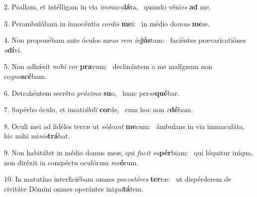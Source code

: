 2. Psallam, et intélligam in via \textit{im}\textit{ma}\textit{cu}\textbf{lá}ta, \ast\  quando véni\textit{es} \textbf{ad} me.\

3. Perambulábam in innocénti\textit{a} \textit{cor}\textit{dis} \textbf{me}i: \ast\  in médio do\textit{mus} \textbf{me}æ.\

4. Non proponébam ante óculos me\textit{os} \textit{rem} \textit{in}\textbf{jús}tam: \ast\  faciéntes prævaricatiónes \textit{o}\textbf{dí}vi.\

5. Non adhǽsit \textit{mi}\textit{hi} \textit{cor} \textbf{pra}vum: \ast\  declinántem a me malígnum non co\textit{gno}\textbf{scé}bam.\

6. Detrahéntem secréto \textit{pró}\textit{xi}\textit{mo} \textbf{su}o, \ast\  hunc per\textit{se}\textbf{qué}bar.\

7. Supérbo óculo, et insati\textit{á}\textit{bi}\textit{li} \textbf{cor}de, \ast\  cum hoc non \textit{e}\textbf{dé}bam.\

8. Oculi mei ad fidéles terræ ut \textit{sé}\textit{de}\textit{ant} \textbf{me}cum: \ast\  ámbulans in via immaculáta, hic mihi mi\textit{nis}\textbf{trá}bat.\

9. Non habitábit in médio domus meæ, qui \textit{fa}\textit{cit} \textit{su}\textbf{pér}biam: \ast\  qui lóquitur iníqua, non diréxit in conspéctu oculórum \textit{me}\textbf{ó}rum.\

10. In matutíno interficiébam omnes pec\textit{ca}\textit{tó}\textit{res} \textbf{ter}ræ: \ast\  ut dispérderem de civitáte Dómini omnes operántes ini\textit{qui}\textbf{tá}tem.\

